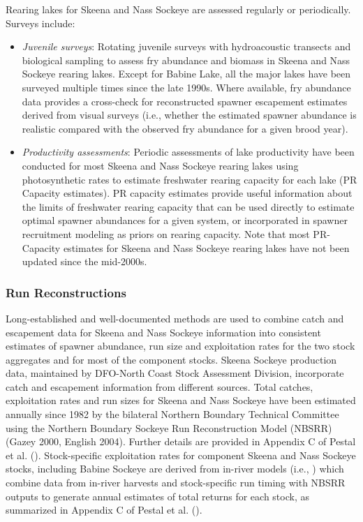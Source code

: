 \documentclass[french,11pt]{book}
\begin{document}
Rearing lakes for Skeena and Nass Sockeye are assessed regularly or periodically. Surveys include:
\begin{itemize}

\item
  \emph{Juvenile surveys}: Rotating juvenile surveys with hydroacoustic transects and biological sampling to assess fry abundance and biomass in Skeena and Nass Sockeye rearing lakes. Except for Babine Lake, all the major lakes have been surveyed multiple times since the late 1990s. Where available, fry abundance data provides a cross-check for reconstructed spawner escapement estimates derived from visual surveys (i.e., whether the estimated spawner abundance is realistic compared with the observed fry abundance for a given brood year).
\item
  \emph{Productivity assessments}: Periodic assessments of lake productivity have been conducted for most Skeena and Nass Sockeye rearing lakes using photosynthetic rates to estimate freshwater rearing capacity for each lake (PR Capacity estimates). PR capacity estimates provide useful information about the limits of freshwater rearing capacity that can be used directly to estimate optimal spawner abundances for a given system, or incorporated in spawner recruitment modeling as priors on rearing capacity. Note that most PR-Capacity estimates for Skeena and Nass Sockeye rearing lakes have not been updated since the mid-2000s.
\end{itemize}
\subsubsection{Run Reconstructions}\label{RunReconEst}

Long-established and well-documented methods are used to combine catch and escapement data for Skeena and Nass Sockeye information into consistent estimates of spawner abundance, run size and exploitation rates for the two stock aggregates and for most of the component stocks. Skeena Sockeye production data, maintained by DFO-North Coast Stock Assessment Division, incorporate catch and escapement information from different sources. Total catches, exploitation rates and run sizes for Skeena and Nass Sockeye have been estimated annually since 1982 by the bilateral Northern Boundary Technical Committee using the Northern Boundary Sockeye Run Reconstruction Model (NBSRR) (Gazey 2000, English 2004). Further details are provided in Appendix C of Pestal et al. (). Stock-specific exploitation rates for component Skeena and Nass Sockeye stocks, including Babine Sockeye are derived from in-river models (i.e., ) which combine data from in-river harvests and stock-specific run timing with NBSRR outputs to generate annual estimates of total returns for each stock, as summarized in Appendix C of Pestal et al. ().
\end{document}
